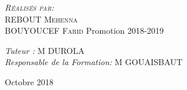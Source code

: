 \documentclass[12pt, a4paper, openany]{report}
\begin{document}
\begin{titlepage}
\begin{sffamily}
\begin{center}
    \begin{minipage}{0.4\textwidth}
      \begin{flushleft} \large
         \textsc{\emph {Réalisés par:} \\REBOUT Mehenna}\\
         \textsc{BOUYOUCEF Farid}   
          \newline
          Promotion 2018-2019 \\
      \end{flushleft}
    \end{minipage}
    \begin{minipage}{0.4\textwidth}
      \begin{flushright} \large
        \emph{Tuteur :}  \textsc{M DUROLA}\\
        \emph{Responsable de la Formation:} \textsc{M GOUAISBAUT}
      \end{flushright}
    \end{minipage}

    \vfill

    {\large Octobre 2018}

  \end{center}
  \end{sffamily}      
          
  \end{titlepage}
  
\makeatother




   
\renewcommand{\contentsname}{Sommaire}
\tableofcontents
\listoffigures
\listoftables
 
 
 
 
 
 
 
 
 
\end{document}

